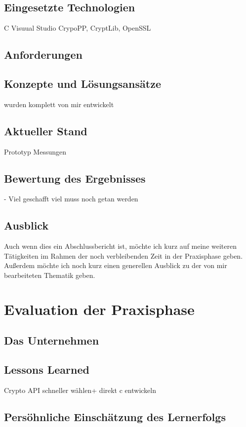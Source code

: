 \subsection{Eingesetzte Technologien}
C 
Visuual Studio 
CrypoPP, CryptLib, OpenSSL


\subsection{Anforderungen}
\subsection{Konzepte und Lösungsansätze}
wurden komplett von mir entwickelt

\subsection{Aktueller Stand} %
Prototyp 
Messungen
\subsection{Bewertung des Ergebnisses} 

- Viel geschafft 
viel muss noch getan werden
\subsection{Ausblick}
Auch wenn dies ein Abschlussbericht ist, möchte ich kurz auf meine weiteren Tätigkeiten im Rahmen der noch verbleibenden Zeit in der Praxisphase geben. Außerdem möchte ich noch kurz einen generellen Ausblick zu der von mir bearbeiteten Thematik geben. 

\section{Evaluation der Praxisphase}
\subsection{Das Unternehmen}
\subsection{Lessons Learned}
Crypto API schneller wählen+
direkt c entwickeln
\subsection{Persöhnliche Einschätzung des Lernerfolgs}



